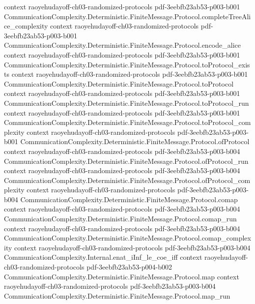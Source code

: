 \begin{theorem}
  {context}
  {raoyehudayoff-ch03-randomized-protocols}
  {pdf-3eebfb23ab53-p003-b001}
\proofstep
  {CommunicationComplexity.Deterministic.FiniteMessage.Protocol.completeTreeAlice_complexity}
  {context}
  {raoyehudayoff-ch03-randomized-protocols}
  {pdf-3eebfb23ab53-p003-b001}
\proofstep
  {CommunicationComplexity.Deterministic.FiniteMessage.Protocol.encode_alice}
  {context}
  {raoyehudayoff-ch03-randomized-protocols}
  {pdf-3eebfb23ab53-p003-b001}
\proofstep
  {CommunicationComplexity.Deterministic.FiniteMessage.Protocol.toProtocol_exists}
  {context}
  {raoyehudayoff-ch03-randomized-protocols}
  {pdf-3eebfb23ab53-p003-b001}
\proofstep
  {CommunicationComplexity.Deterministic.FiniteMessage.Protocol.toProtocol}
  {context}
  {raoyehudayoff-ch03-randomized-protocols}
  {pdf-3eebfb23ab53-p003-b001}
\proofstep
  {CommunicationComplexity.Deterministic.FiniteMessage.Protocol.toProtocol_run}
  {context}
  {raoyehudayoff-ch03-randomized-protocols}
  {pdf-3eebfb23ab53-p003-b001}
\proofstep
  {CommunicationComplexity.Deterministic.FiniteMessage.Protocol.toProtocol_complexity}
  {context}
  {raoyehudayoff-ch03-randomized-protocols}
  {pdf-3eebfb23ab53-p003-b001}
\proofstep
  {CommunicationComplexity.Deterministic.FiniteMessage.Protocol.ofProtocol}
  {context}
  {raoyehudayoff-ch03-randomized-protocols}
  {pdf-3eebfb23ab53-p003-b004}
\proofstep
  {CommunicationComplexity.Deterministic.FiniteMessage.Protocol.ofProtocol_run}
  {context}
  {raoyehudayoff-ch03-randomized-protocols}
  {pdf-3eebfb23ab53-p003-b004}
\proofstep
  {CommunicationComplexity.Deterministic.FiniteMessage.Protocol.ofProtocol_complexity}
  {context}
  {raoyehudayoff-ch03-randomized-protocols}
  {pdf-3eebfb23ab53-p003-b004}
\proofstep
  {CommunicationComplexity.Deterministic.FiniteMessage.Protocol.comap}
  {context}
  {raoyehudayoff-ch03-randomized-protocols}
  {pdf-3eebfb23ab53-p003-b004}
\proofstep
  {CommunicationComplexity.Deterministic.FiniteMessage.Protocol.comap_run}
  {context}
  {raoyehudayoff-ch03-randomized-protocols}
  {pdf-3eebfb23ab53-p003-b004}
\proofstep
  {CommunicationComplexity.Deterministic.FiniteMessage.Protocol.comap_complexity}
  {context}
  {raoyehudayoff-ch03-randomized-protocols}
  {pdf-3eebfb23ab53-p003-b004}
\proofstep
  {CommunicationComplexity.Internal.enat_iInf_le_coe_iff}
  {context}
  {raoyehudayoff-ch03-randomized-protocols}
  {pdf-3eebfb23ab53-p004-b002}
\proofstep
  {CommunicationComplexity.Deterministic.FiniteMessage.Protocol.map}
  {context}
  {raoyehudayoff-ch03-randomized-protocols}
  {pdf-3eebfb23ab53-p003-b004}
\proofstep
  {CommunicationComplexity.Deterministic.FiniteMessage.Protocol.map_run}

\end{theorem}
